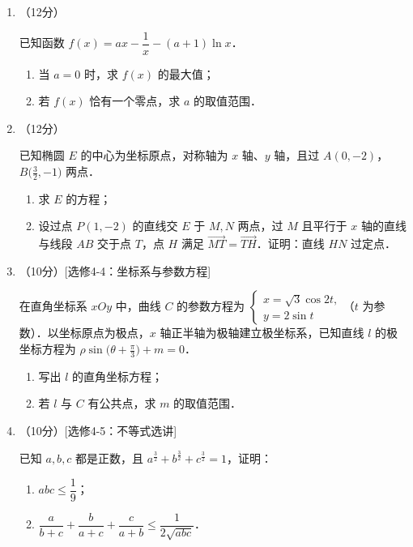 \begin{description}
\begin{enumerate}[leftmargin=5pt]
        \item （12分）

        已知函数 $f(x)=ax-\dfrac{1}{x}-(a+1)\ln x$．

        \begin{enumerate}[label=(\arabic*)]
            \item 当 $a=0$ 时，求 $f(x)$ 的最大值；
            \item 若 $f(x)$ 恰有一个零点，求 $a$ 的取值范围．
        \end{enumerate}

        \item （12分）

        已知椭圆 $E$ 的中心为坐标原点，对称轴为 $x$ 轴、$y$ 轴，且过 $A(0,-2)$，$B\bigl(\frac{3}{2},-1\bigr)$ 两点．

        \begin{enumerate}[label=(\arabic*)]
            \item 求 $E$ 的方程；
            \item 设过点 $P(1,-2)$ 的直线交 $E$ 于 $M,N$ 两点，过 $M$ 且平行于 $x$ 轴的直线与线段 $AB$ 交于点 $T$，点 $H$ 满足 $\overrightarrow{MT}=\overrightarrow{TH}$．证明：直线 $HN$ 过定点．
        \end{enumerate}

        \item （10分）[选修4-4：坐标系与参数方程]

        在直角坐标系 $xOy$ 中，曲线 $C$ 的参数方程为 $\begin{cases}x=\sqrt{3}\cos2t,\\y=2\sin t\end{cases}$（$t$ 为参数）．以坐标原点为极点，$x$ 轴正半轴为极轴建立极坐标系，已知直线 $l$ 的极坐标方程为 $\rho\sin\bigl(\theta+\frac{\pi}{3}\bigr)+m=0$．

        \begin{enumerate}[label=(\arabic*)]
            \item 写出 $l$ 的直角坐标方程；
            \item 若 $l$ 与 $C$ 有公共点，求 $m$ 的取值范围．
        \end{enumerate}

        \item （10分）[选修4-5：不等式选讲]

        已知 $a,b,c$ 都是正数，且 $a^{\frac{3}{2}}+b^{\frac{3}{2}}+c^{\frac{3}{2}}=1$，证明：

        \begin{enumerate}[label=(\arabic*)]
            \item $abc\leqslant\dfrac{1}{9}$；
            \item $\dfrac{a}{b+c}+\dfrac{b}{a+c}+\dfrac{c}{a+b}\leqslant\dfrac{1}{2\sqrt{abc}}$．
        \end{enumerate}
    \end{enumerate}
\end{description}
\clearpage


